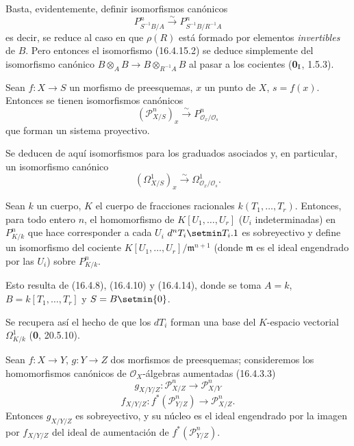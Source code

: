 Basta, evidentemente, definir isomorfismos canónicos
\[
  P_{S^{-1}B/A}^n\xrightarrow{\sim}P_{S^{-1}B/R^{-1}A}^n
  \tag{16.4.15.2}
  \label{IV.16.4.15.2}
\]
es decir, se reduce al caso en que $\rho(R)$ está formado por elementos
\emph{invertibles} de $B$. Pero entonces el isomorfismo (16.4.15.2) se
deduce simplemente del isomorfismo canónico
$B\otimes_A B\to B\otimes_{R^{-1}A}B$ al pasar a los cocientes
(\textbf{0}$_{\rm I}$, 1.5.3).

\begin{corollary}[16.4.16]
\label{IV.16.4.16}
Sean $f:X\to S$ un morfismo de preesquemas, $x$ un punto de $X$,
$s=f(x)$. Entonces se tienen isomorfismos canónicos
\[
  (\mathscr{P}_{X/S}^n)_x\xrightarrow{\sim}
  P_{\mathcal{O}_x/\mathcal{O}_s}^n
  \tag{16.4.16.1}
  \label{IV.16.4.16.1}
\]
que forman un sistema proyectivo.
\end{corollary}

Se deducen de aquí isomorfismos para los graduados asociados y, en particular,
un isomorfismo canónico
\[
  (\varOmega_{X/S}^1)_x\xrightarrow{\sim}
  \Omega_{\mathcal{O}_x/\mathcal{O}_s}^1.
  \tag{16.4.16.2}
  \label{IV.16.4.16.2}
\]

\begin{corollary}[16.4.17]
\label{IV.16.4.17}
Sean $k$ un cuerpo, $K$ el cuerpo de fracciones racionales
$k(T_1,\ldots,T_r)$. Entonces, para todo entero $n$, el homomorfismo de
$K[U_1,\ldots,U_r]$ ($U_i$ indeterminadas) en $P_{K/k}^n$ que hace corresponder a cada $U_i$
$d^nT_i\setmin T_i.1$ es sobreyectivo y define un isomorfismo
del cociente $K[U_1,\ldots,U_r]/\mathfrak{m}^{n+1}$ (donde $\mathfrak{m}$ es
el ideal engendrado por las $U_i$) sobre $P_{K/k}^n$.
\end{corollary}

Esto resulta de (16.4.8), (16.4.10) y (16.4.14), donde se toma $A=k$,
$B=k[T_1,\ldots,T_r]$ y $S=B\setmin\{0\}$.

Se recupera así el hecho de que los $dT_i$ forman una base del $K$-espacio
vectorial $\Omega_{K/k}^1$ (\textbf 0, 20.5.10).

\begin{proposition}[16.4.18]
\label{IV.16.4.18}
Sean $f:X\to Y$, $g:Y\to Z$ dos morfismos de preesquemas; consideremos
los homomorfismos canónicos de $\mathcal{O}_X$-álgebras aumentadas
\textup{(16.4.3.3)}
\[
  g_{X/Y/Z}:\mathscr{P}_{X/Z}^n\longrightarrow\mathscr{P}_{X/Y}^n
  \tag{16.4.18.1}
  \label{IV.16.4.18.1}
\]
\[
  f_{X/Y/Z}:f^*(\mathscr{P}_{Y/Z}^n)
  \longrightarrow\mathscr{P}_{X/Z}^n.
  \tag{16.4.18.2}
  \label{IV.16.4.18.2}
\]
Entonces $g_{X/Y/Z}$ es sobreyectivo, y su núcleo es el ideal engendrado por la imagen
por $f_{X/Y/Z}$ del ideal de aumentación de
$f^*(\mathscr{P}_{Y/Z}^n)$.
\end{proposition}

